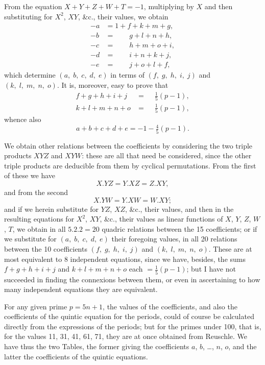 \documentclass[11pt,a4paper,english]{article}
\theoremstyle{plain}
\begin{document}
From the equation $X + Y + Z + W + T = -1$, multiplying by $X$ and then substituting for $X^2$, $XY$, \&c., their values, we obtain
\begin{align*}
-a &= 1 + f + k + m + g, \\
-b &= \phantom{1 +}\; g + l + n + h, \\
-c &= \phantom{1 +}\; h + m + o + i, \\
-d &= \phantom{1 +}\; i + n + k + j, \\
-e &= \phantom{1 +}\; j + o + l + f,
\end{align*}
which determine $(a,\; b,\; c,\; d,\; e)$ in terms of $(f,\; g,\; h,\; i,\; j)$ and $(k,\; l,\; m,\; n,\; o)$. It is, moreover, easy to prove that
\begin{align*}
f + g + h + i + j &= \phantom{-}\tfrac{1}{5}(p - 1), \\
k + l + m + n + o &= \phantom{-}\tfrac{1}{5}(p - 1),
\end{align*}
whence also
\[
a + b + c + d + e = -1 - \tfrac{4}{5}(p - 1).
\]

We obtain other relations between the coefficients by considering the two triple products $XYZ$ and $XYW$: these are all that need be considered, since the other triple products are deducible from them by cyclical permutations. From the first of these we have
\[
X.YZ = Y.XZ = Z.XY,
\]
and from the second
\[
X.YW = Y.XW = W.XY;
\]
and if we herein substitute for $YZ$, $XZ$, \&c., their values, and then in the resulting equations for $X^2$, $XY$, \&c., their values as linear functions of $X$, $Y$, $Z$, $W$, $T$, we obtain in all $5.2.2 = 20$ quadric relations between the 15 coefficients; or if we substitute for $(a,\; b,\; c,\; d,\; e)$ their foregoing values, in all 20 relations between the 10 coefficients $(f,\; g,\; h,\; i,\; j)$ and $(k,\; l,\; m,\; n,\; o)$. These are at most equivalent to 8 independent equations, since we have, besides, the sums $f + g + h + i + j$ and $k + l + m + n + o$ each $= \tfrac{1}{5}(p - 1)$; but I have not succeeded in finding the connexions between them, or even in ascertaining to how many independent equations they are equivalent.

For any given prime $p = 5n + 1$, the values of the coefficients, and also the coefficients of the quintic equation for the periods, could of course be calculated directly from the expressions of the periods; but for the primes under 100, that is, for the values 11, 31, 41, 61, 71, they are at once obtained from Reuschle. We have thus the two Tables, the former giving the coefficients $a$, $b$, \ldots, $n$, $o$, and the latter the coefficients of the quintic equations.
\end{document}
